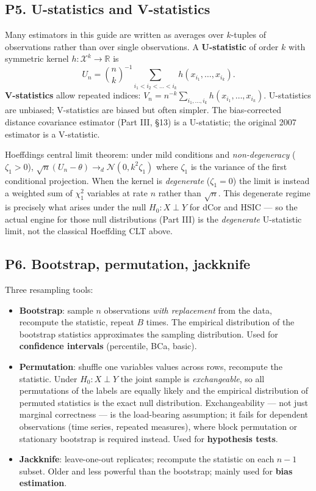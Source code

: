 \documentclass{article}
\providecommand{\tightlist}{\setlength{\itemsep}{0pt}\setlength{\parskip}{0pt}}
\begin{document}
\subsection{P5. U-statistics and
V-statistics}\label{p5-u-statistics-and-v-statistics}

Many estimators in this guide are written as averages over \(k\)-tuples
of observations rather than over single observations. A
\textbf{U-statistic} of order \(k\) with symmetric kernel
\(h: \mathcal{X}^k \to \mathbb{R}\) is \[
U_n = \binom{n}{k}^{-1} \sum_{i_1 < i_2 < \dots < i_k} h(x_{i_1}, \dots, x_{i_k}).
\] \textbf{V-statistics} allow repeated indices:
\(V_n = n^{-k}\sum_{i_1, \dots, i_k} h(x_{i_1}, \dots, x_{i_k})\).
U-statistics are unbiased; V-statistics are biased but often simpler.
The bias-corrected distance covariance estimator (Part III, §13) is a
U-statistic; the original 2007 estimator is a V-statistic.

Hoeffding\textquotesingle s central limit theorem: under mild
conditions and \emph{non-degeneracy} (\(\zeta_1 > 0\)),
\(\sqrt{n}(U_n - \theta) \to_d \mathcal{N}(0, k^2 \zeta_1)\)
where \(\zeta_1\) is the variance of the first conditional projection.
When the kernel is \emph{degenerate} (\(\zeta_1 = 0\)) the limit is instead
a weighted sum of \(\chi^2_1\) variables at rate \(n\) rather than \(\sqrt{n}\).
This degenerate regime is precisely what arises under the null \(H_0: X \perp Y\)
for dCor and HSIC --- so the actual engine for those null distributions (Part III)
is the \emph{degenerate} U-statistic limit, not the classical Hoeffding CLT above.

\subsection{P6. Bootstrap, permutation,
jackknife}\label{p6-bootstrap-permutation-jackknife}

Three resampling tools:

\begin{itemize}
\tightlist
\item
  \textbf{Bootstrap}: sample \(n\) observations \emph{with replacement}
  from the data, recompute the statistic, repeat \(B\) times. The
  empirical distribution of the bootstrap statistics approximates the
  sampling distribution. Used for \textbf{confidence intervals}
  (percentile, BCa, basic).
\item
  \textbf{Permutation}: shuffle one variable\textquotesingle s values
  across rows, recompute the statistic. Under \(H_0: X \perp Y\) the joint
  sample is \emph{exchangeable}, so all permutations of the labels are
  equally likely and the empirical distribution of permuted statistics
  is the exact null distribution. Exchangeability --- not just marginal
  correctness --- is the load-bearing assumption; it fails for dependent
  observations (time series, repeated measures), where block permutation
  or stationary bootstrap is required instead. Used for \textbf{hypothesis tests}.
\item
  \textbf{Jackknife}: leave-one-out replicates; recompute the statistic
  on each \(n-1\) subset. Older and less powerful than the bootstrap;
  mainly used for \textbf{bias estimation}.
\end{itemize}
\end{document}
